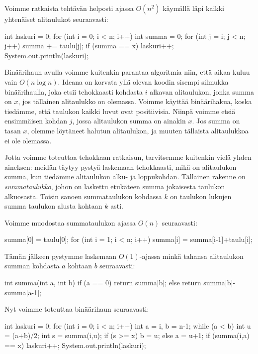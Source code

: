 Voimme ratkaista tehtävän helposti ajassa $O(n^2)$
käymällä läpi kaikki yhtenäiset alitaulukot seuraavasti:

\begin{code}
int laskuri = 0;
for (int i = 0; i < n; i++) {
    int summa = 0;
    for (int j = i; j < n; j++) {
        summa += taulu[j];
        if (summa == x) laskuri++;
    }
}
System.out.println(laskuri);
\end{code}

Binäärihaun avulla voimme kuitenkin parantaa algoritmia niin,
että aikaa kuluu vain $O(n \log n)$.
Ideana on korvata yllä olevan koodin sisempi silmukka
binäärihaulla, joka etsii tehokkaasti kohdasta $i$
alkavan alitaulukon, jonka summa on $x$, jos tällainen alitaulukko on olemassa.
Voimme käyttää binäärihakua, koska tiedämme, että taulukon kaikki
luvut ovat positiivisia.
Niinpä voimme etsiä ensimmäisen kohdan $j$,
jossa alitaulukon summa on ainakin $x$.
Jos summa on tasan $x$, olemme löytäneet halutun alitaulukon,
ja muuten tällaista alitaulukkoa ei ole olemassa.

Jotta voimme toteuttaa tehokkaan ratkaisun,
tarvitsemme kuitenkin vielä yhden aineksen:
meidän täytyy pystyä laskemaan tehokkaasti,
mikä on alitaulukon summa,
kun tiedämme alitaulukon alku- ja loppukohdan.
Tällainen rakenne on \emph{summataulukko},
johon on laskettu etukäteen summa jokaisesta taulukon alkuosasta.
Toisin sanoen summataulukon kohdassa $k$ on taulukon
lukujen summa taulukon alusta kohtaan $k$ asti.

Voimme muodostaa summataulukon ajassa $O(n)$ seuraavasti:

\begin{code}
summa[0] = taulu[0];
for (int i = 1; i < n; i++) {
    summa[i] = summa[i-1]+taulu[i];
}
\end{code}

Tämän jälkeen pystymme laskemaan $O(1)$-ajassa minkä tahansa
alitaulukon summan kohdasta $a$ kohtaan $b$ seuraavasti:

\begin{code}
int summa(int a, int b) {
    if (a == 0) return summa[b];
    else return summa[b]-summa[a-1];
}
\end{code}

Nyt voimme toteuttaa binäärihaun seuraavasti:

\begin{code}
int laskuri = 0;
for (int i = 0; i < n; i++) {
    int a = i, b = n-1;
    while (a < b) {
        int u = (a+b)/2;
        int s = summa(i,u);
        if (s >= x) b = u;
        else a = u+1;
    }
    if (summa(i,a) == x) laskuri++;
}
System.out.println(laskuri);
\end{code}

